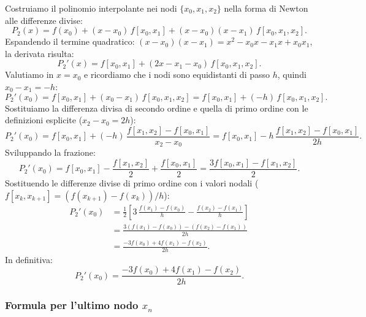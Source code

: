 \documentclass[a4paper,12pt]{article}
\theoremstyle{definition}
\theoremstyle{remark}
\begin{document}
Costruiamo il polinomio interpolante nei nodi $\{x_0, x_1, x_2\}$
nella forma di Newton alle differenze divise:
\[
  P_2(x)
  = f(x_0)
  + (x - x_0)\,f[x_0, x_1]
  + (x - x_0)(x - x_1)\,f[x_0, x_1, x_2].
\]
Espandendo il termine quadratico:
$(x-x_0)(x-x_1) = x^2 - x_0 x - x_1 x + x_0 x_1$,
la derivata risulta:
\[
  P_2'(x) = f[x_0, x_1] + (2x - x_1 - x_0)\,f[x_0, x_1, x_2].
\]
Valutiamo in $x = x_0$ e ricordiamo che i nodi sono equidistanti di passo $h$,
quindi $x_0 - x_1 = -h$:
\[
  P_2'(x_0)
  = f[x_0, x_1] + (x_0 - x_1)\,f[x_0, x_1, x_2]
  = f[x_0, x_1] + (-h)\,f[x_0, x_1, x_2].
\]
Sostituiamo la differenza divisa di secondo ordine e quella di primo ordine
con le definizioni esplicite ($x_2 - x_0 = 2h$):
\[
  P_2'(x_0)
  = f[x_0, x_1] + (-h)\,\frac{f[x_1, x_2] - f[x_0, x_1]}{x_2 - x_0}
  = f[x_0, x_1] - h\,\frac{f[x_1, x_2] - f[x_0, x_1]}{2h}.
\]
Sviluppando la frazione:
\[
  P_2'(x_0)
  = f[x_0, x_1] - \frac{f[x_1, x_2]}{2} + \frac{f[x_0, x_1]}{2}
  = \frac{3 f[x_0, x_1] - f[x_1, x_2]}{2}.
\]
Sostituendo le differenze divise di primo ordine con i valori nodali
($f[x_k, x_{k+1}] = (f(x_{k+1}) - f(x_k))/h$):
\begin{align*}
  P_2'(x_0)
  &= \frac{1}{2}\left[3\,\frac{f(x_1)-f(x_0)}{h} - \frac{f(x_2)-f(x_1)}{h}\right]\\
  &= \frac{3(f(x_1)-f(x_0)) - (f(x_2)-f(x_1))}{2h}\\
  &= \frac{-3f(x_0) + 4f(x_1) - f(x_2)}{2h}.
\end{align*}
In definitiva:
\[
  \boxed{P_2'(x_0) = \frac{-3f(x_0) + 4f(x_1) - f(x_2)}{2h}}.
\]

\subsubsection{Formula per l'ultimo nodo \texorpdfstring{$x_n$}{xn}}
\end{document}
